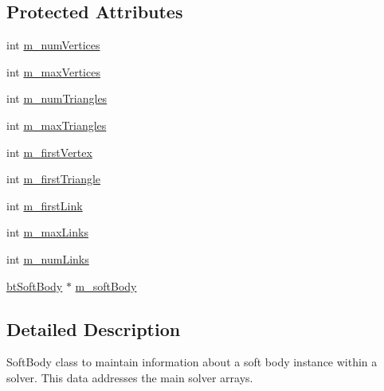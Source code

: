 \subsection*{Protected Attributes}
\begin{DoxyCompactItemize}
\item 
int \hyperlink{classbt_open_c_l_accelerated_soft_body_interface_a7066f48b63d0a783e0527eb66489aae3}{m\+\_\+num\+Vertices}
\item 
int \hyperlink{classbt_open_c_l_accelerated_soft_body_interface_a22315dd7b0bb4cb93f54c9a5fc8e8bd4}{m\+\_\+max\+Vertices}
\item 
int \hyperlink{classbt_open_c_l_accelerated_soft_body_interface_a294ea06835204cca54467b44312940fd}{m\+\_\+num\+Triangles}
\item 
int \hyperlink{classbt_open_c_l_accelerated_soft_body_interface_aef48706f7d1d803817a12c2594956420}{m\+\_\+max\+Triangles}
\item 
int \hyperlink{classbt_open_c_l_accelerated_soft_body_interface_a01a8a8cb234b7f0b1b629a6d03f5f0c7}{m\+\_\+first\+Vertex}
\item 
int \hyperlink{classbt_open_c_l_accelerated_soft_body_interface_abc2c9ff04bfe0d0a9578e53ba736c309}{m\+\_\+first\+Triangle}
\item 
int \hyperlink{classbt_open_c_l_accelerated_soft_body_interface_a690606a7caf85dcbf3c20d67026fc4ed}{m\+\_\+first\+Link}
\item 
int \hyperlink{classbt_open_c_l_accelerated_soft_body_interface_a52e623365139c2d6b2833acb77415804}{m\+\_\+max\+Links}
\item 
int \hyperlink{classbt_open_c_l_accelerated_soft_body_interface_a34f2f02626d058ee305fe5f66b3ee0a2}{m\+\_\+num\+Links}
\item 
\hyperlink{classbt_soft_body}{bt\+Soft\+Body} $\ast$ \hyperlink{classbt_open_c_l_accelerated_soft_body_interface_a2826fac4aa50ec2bd23660afd1f95091}{m\+\_\+soft\+Body}
\end{DoxyCompactItemize}


\subsection{Detailed Description}
Soft\+Body class to maintain information about a soft body instance within a solver. This data addresses the main solver arrays. 

